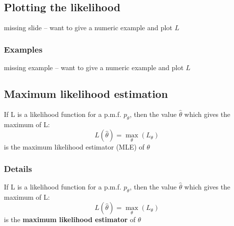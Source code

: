 \documentclass[12pt,a4paper]{article}
\theoremstyle{regla}
\theoremstyle{remark}
\theoremstyle{definition}
\theoremstyle{nonumberbreak}
\begin{document}
\subsection{Plotting the likelihood}
\begin{fbox}
\begin{minipage}{0.97\textwidth}
missing slide -- want to give a numeric example and plot $L$
\end{minipage}
\end{fbox}
\subsubsection{Examples}
missing example -- want to give a numeric example and plot $L$

\subsection{Maximum likelihood estimation}
\begin{fbox}
\begin{minipage}{0.97\textwidth}
If L is a likelihood function for a p.m.f. $ p_{\theta}$, then the value $\hat{\theta}$ which gives the maximum of L:
$$ 
L (\hat{\theta}) = \max_\theta ({L}_\theta) 
$$
is the maximum likelihood estimator (MLE) of $\theta$

\end{minipage}
\end{fbox}
\subsubsection{Details}
\begin{defn}
If L is a likelihood function for a p.m.f. $ p_{\theta}$, then the value $\hat{\theta}$ which gives the maximum of L:
$$ 
L (\hat{\theta}) = \max_\theta ({L}_\theta) 
$$
is the {\bf maximum likelihood estimator} of $\theta$
\end{defn}
\end{document}

